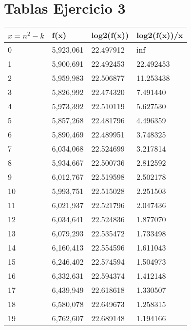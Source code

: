 % 

\newpage
\section{Tablas Ejercicio 3} \label{sec:tablas-ej3}

\begin{table}[H]
\parbox{0.3\textwidth}{
  \begin{tabular}{| l | l | l | l |}
    \hline
    $x=n^2-k$ & f(x) & log2(f(x)) & log2(f(x))/x 	\\ \hline
    0	&5,923,061	&22.497912	&inf				\\ \hline
    1	&5,900,691	&22.492453	&22.492453			\\ \hline
    2	&5,959,983	&22.506877	&11.253438			\\ \hline
    3	&5,826,992	&22.474320	&7.491440			\\ \hline
    4	&5,973,392	&22.510119	&5.627530			\\ \hline
    5	&5,857,268	&22.481796	&4.496359			\\ \hline
    6	&5,890,469	&22.489951	&3.748325			\\ \hline
    7	&6,034,068	&22.524699	&3.217814			\\ \hline
    8	&5,934,667	&22.500736	&2.812592			\\ \hline
    9	&6,012,767	&22.519598	&2.502178			\\ \hline
    10	&5,993,751	&22.515028	&2.251503			\\ \hline
    11	&6,021,937	&22.521796	&2.047436			\\ \hline
    12	&6,034,641	&22.524836	&1.877070			\\ \hline
    13	&6,079,293	&22.535472	&1.733498			\\ \hline
    14	&6,160,413	&22.554596	&1.611043			\\ \hline
    15	&6,246,402	&22.574594	&1.504973			\\ \hline
    16	&6,332,631	&22.594374	&1.412148			\\ \hline
    17	&6,439,949	&22.618618	&1.330507			\\ \hline
    18	&6,580,078	&22.649673	&1.258315			\\ \hline
    19	&6,762,607	&22.689148	&1.194166			\\ \hline

\end{tabular}}
\end{table}

